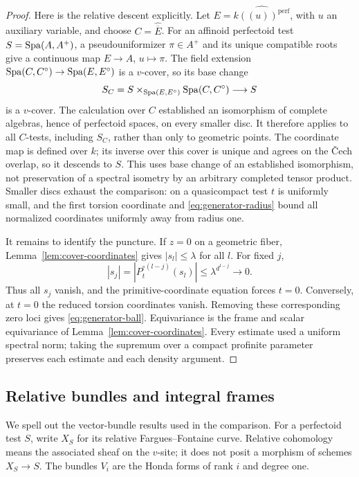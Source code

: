 \begin{proof}
Here is the relative descent explicitly.  Let
$E=\widehat{k((u))^{\mathrm{perf}}}$, with $u$ an auxiliary
variable, and choose $C=\widehat{\overline E}$.
For an affinoid perfectoid test $S=\operatorname{Spa}(A,A^+)$, a
pseudouniformizer $\pi\in A^+$ and its unique compatible roots
give a continuous map $E\to A$, $u\mapsto\pi$.
The field extension $\operatorname{Spa}(C,C^\circ)\to\operatorname{Spa}(E,E^\circ)$ is
a $v$-cover, so its base change
\[
 S_C=S\times_{\operatorname{Spa}(E,E^\circ)}\operatorname{Spa}(C,C^\circ)\longrightarrow S
\]
is a $v$-cover.  The calculation over $C$ established an
isomorphism of complete algebras, hence of perfectoid spaces,
on every smaller disc.  It therefore applies to all $C$-tests,
including $S_C$, rather than only to geometric points.
The coordinate map is defined over $k$; its inverse over this
cover is unique and agrees on the \v Cech overlap, so it descends
to $S$.  This uses base change of an established isomorphism,
not preservation of a spectral isometry by an arbitrary
completed tensor product.  Smaller discs exhaust the comparison:
on a quasicompact test $t$ is uniformly small, and the first
torsion coordinate and \eqref{eq:generator-radius} bound all
normalized coordinates uniformly away from radius one.

It remains to identify the puncture.  If $z=0$ on a geometric fiber,
Lemma~\ref{lem:cover-coordinates} gives $|s_l|\leq\lambda$ for all
$l$.  For fixed $j$,
\[
 |s_j|=|P_t^{\circ(l-j)}(s_l)|
           \leq\lambda^{d^{l-j}}\longrightarrow0.
\]
Thus all $s_j$ vanish, and the primitive-coordinate equation forces
$t=0$.  Conversely, at $t=0$ the reduced torsion coordinates vanish.
Removing these corresponding zero loci gives
\eqref{eq:generator-ball}.  Equivariance is the frame and scalar
equivariance of Lemma~\ref{lem:cover-coordinates}.
Every estimate used a uniform spectral norm; taking the supremum
over a compact profinite parameter preserves each estimate and each
density argument.
\end{proof}

\subsection{Relative bundles and integral frames}

We spell out the vector-bundle results used in the comparison.
For a perfectoid test $S$, write $X_S$ for its relative
Fargues--Fontaine curve.  Relative cohomology means the associated
sheaf on the $v$-site; it does not posit a morphism of schemes
$X_S\to S$.  The bundles $V_i$ are the Honda forms of rank $i$
and degree one.

